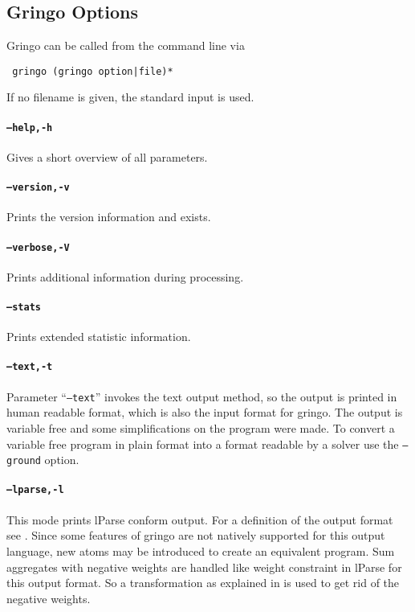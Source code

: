 \documentclass[a4paper,10pt]{article}
\begin{document}
\subsection{Gringo Options}
Gringo can be called from the command line via
\begin{verbatim}
 gringo (gringo option|file)*
\end{verbatim}
If no filename is given, the standard input is used.

\paragraph{\texttt{--help,-h}}
Gives a short overview of all parameters.
\paragraph{\texttt{--version,-v}}
Prints the version information and exists.
\paragraph{\texttt{--verbose,-V}}
Prints additional information during processing.
\paragraph{\texttt{--stats}}
Prints extended statistic information.

\paragraph{\texttt{--text,-t}}
Parameter ``\texttt{--text}'' invokes the text output method, so the output is printed in human readable format, which is also the input format for gringo. The output is variable free and some simplifications on the program were made. To convert a variable free program in plain format into a format readable by a solver use the \texttt{--ground} option.
\paragraph{\texttt{--lparse,-l}}
This mode prints lParse conform output. For a definition of the output format see \cite{lparseManual}.
Since some features of gringo are not natively supported for this output language, new atoms may be introduced to create an equivalent program.\newline
Sum aggregates with negative weights are handled like weight constraint in lParse for this output format. So a transformation as explained in \cite{lparseManual} is used to get rid of the negative weights.
\end{document}

